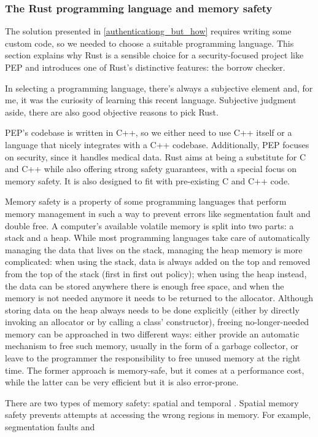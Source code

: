 \documentclass{report}
\begin{document}
\subsubsection{The Rust programming language and memory safety} \label{rust_memory_safety}
The solution presented in \ref{authenticationg_but_how} requires writing some custom code, so we needed to choose a suitable programming language. This section explains why Rust is
a sensible choice for a security-focused project like PEP and introduces one of Rust's distinctive features: the borrow checker.\par
In selecting a programming language, there's always a subjective element and, for me, it was the curiosity of learning this recent language. Subjective judgment aside, there are also good objective reasons to pick Rust. \par
PEP's codebase is written in C++, so we either need to use C++ itself or a language that nicely integrates with a C++ codebase. Additionally, PEP focuses on security, since it
handles medical data. Rust aims at being a substitute for C and C++ while also offering strong safety guarantees, with a special focus on memory safety. It is also designed to fit
with pre-existing C and C++ code. \par
Memory safety is a property of some programming languages that perform memory management in such a way to prevent errors like segmentation fault and double free. A computer's
available volatile memory is split into two parts: a stack and a heap. While most programming languages take care of automatically managing the data that lives on the stack,
managing the heap memory is more complicated: when using the stack, data is always added on the top and removed from the top of the stack (first in first out policy); when using the heap instead, the data can
be stored anywhere there is enough free space, and when the memory is not needed anymore it needs to be returned to the allocator. Although storing data on the heap always needs to
be done explicitly (either by directly invoking an allocator or by calling a class' constructor), freeing no-longer-needed memory can be approached in two different ways: either provide an automatic mechanism to free such memory, usually in the form of a
garbage collector, or leave to the programmer the responsibility to free unused memory at the right time. The former approach is memory-safe, but it comes at a performance cost,
while the latter can be very efficient but it is also error-prone. \par
There are two types of memory safety: spatial and temporal \cite{eternal-war-in-memory}. Spatial memory safety prevents attempts at accessing the wrong regions in memory. For example, segmentation faults and
\end{document}
